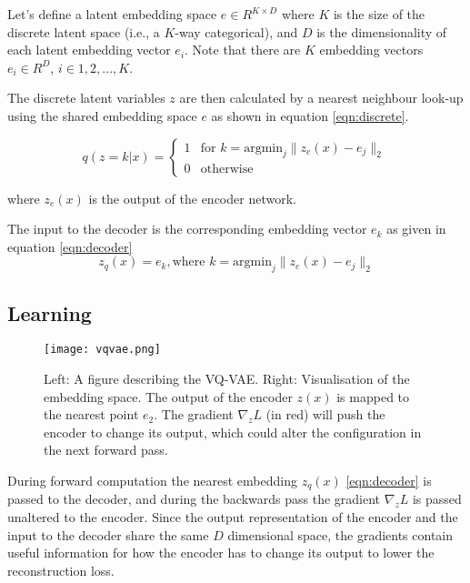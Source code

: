 Let's define a latent embedding space $e \in R^{K \times D}$ where $K$ is the size of the discrete latent space 
(i.e., a $K$-way categorical), and $D$ is the dimensionality of each latent embedding vector $e_{i}$.
Note that there are $K$ embedding vectors $e_{i} \in R ^D$, $i\in{1, 2, ..., K}$.

The discrete latent variables $z$ are then calculated by a nearest 
neighbour look-up using the shared embedding space $e$ as shown in equation \ref{eqn:discrete}.

\begin{equation}
q(z = k|x) =
\begin{cases}
    1 & \text{for } k = \text{argmin}_{j} \| z_{e}(x) - e_{j} \|_{2} \\
    0 & \text{otherwise}
\end{cases}
\label{eqn:discrete}
\end{equation} 

where $z _e(x)$ is the output of the encoder network.

The input to the decoder is the corresponding embedding vector $e _k$ as given in equation \ref{eqn:decoder}
\begin{equation}
    z _q(x) = e _k, \text{where } k= \text{argmin} _j \| z _e(x) - e _j \| _2
    \label{eqn:decoder}
\end{equation}

\subsection{Learning}

\begin{figure}[h]
    \begin{center}
        \texttt{[image: vqvae.png]}
    \end{center}
    \caption{Left: A figure describing the VQ-VAE. Right: Visualisation of the embedding space. The
    output of the encoder $z(x)$ is mapped to the nearest point $e _2$. The gradient $\nabla _z L$ (in red) will push the
    encoder to change its output, which could alter the configuration in the next forward pass.~\cite{razavi2019generating}}
    \label{fig:vqvae}
\end{figure}

During forward computation the nearest embedding $z _q(x)$ \ref{eqn:decoder} is passed to the decoder,
and during the backwards pass the gradient $\nabla _z L$ is passed unaltered to the encoder. 
Since the output representation of the encoder and the input to the decoder share the same $D$
dimensional space, the gradients contain useful information for how the encoder has to change its 
output to lower the reconstruction loss.

